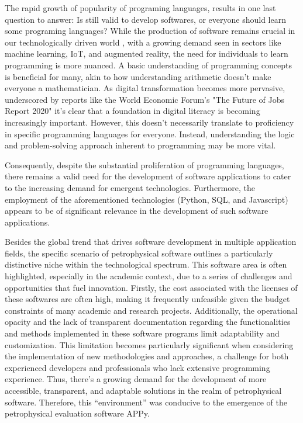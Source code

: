 \documentclass[10pt,twocolumn,twoside]{article}
\begin{document}
The rapid growth of popularity of programing languages, results in one last question to answer: Is still valid to develop softwares, or everyone should learn some programing languages? While the production of software remains crucial in our technologically driven world \citep{usbureau2023}, with a growing demand seen in sectors like machine learning, IoT, and augmented reality, the need for individuals to learn programming is more nuanced. A basic understanding of programming concepts is beneficial for many, akin to how understanding arithmetic doesn't make everyone a mathematician. As digital transformation becomes more pervasive, underscored by reports like the World Economic Forum's "The Future of Jobs Report 2020" \citep{weforum2020} it's clear that a foundation in digital literacy is becoming increasingly important. However, this doesn't necessarily translate to proficiency in specific programming languages for everyone. Instead, understanding the logic and problem-solving approach inherent to programming may be more vital.

Consequently, despite the substantial proliferation of programming languages, there remains a valid need for the development of software applications to cater to the increasing demand for emergent technologies. Furthermore, the employment of the aforementioned technologies (Python, SQL, and Javascript) appears to be of significant relevance in the development of such software applications. 

Besides the global trend that drives software development in multiple application fields, the specific scenario of petrophysical software outlines a particularly distinctive niche within the technological spectrum. This software area is often highlighted, especially in the academic context, due to a series of challenges and opportunities that fuel innovation. Firstly, the cost associated with the licenses of these softwares are often high, making it frequently unfeasible given the budget constraints of many academic and research projects. Additionally, the operational opacity and the lack of transparent documentation regarding the functionalities and methods implemented in these software programs limit adaptability and customization. This limitation becomes particularly significant when considering the implementation of new methodologies and approaches, a challenge for both experienced developers and professionals who lack extensive programming experience. Thus, there's a growing demand for the development of more accessible, transparent, and adaptable solutions in the realm of petrophysical software. Therefore, this ``environment'' was conducive to the emergence of the petrophysical evaluation software APPy.
\end{document}
